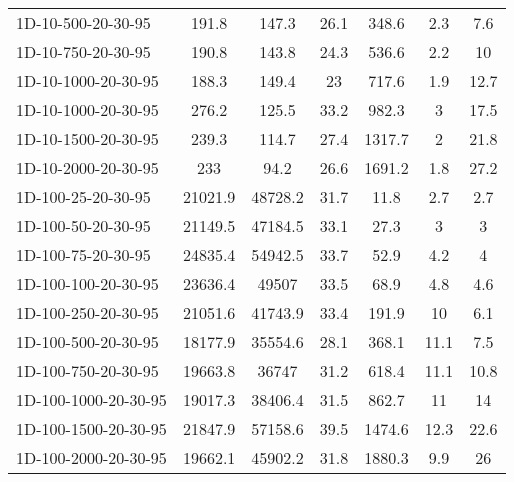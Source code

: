 \documentclass{article}
\begin{document}
\begin{table}[h]
\begin{center}
\begin{tabular}{|l||c|c|c|c|c|c|}
            1D-10-500-20-30-95                      & 191.8   & 147.3      & 26.1       & 348.6       & 2.3       & 7.6        \\
            1D-10-750-20-30-95                      & 190.8   & 143.8      & 24.3       & 536.6       & 2.2       & 10         \\
            1D-10-1000-20-30-95                     & 188.3   & 149.4      & 23         & 717.6       & 1.9       & 12.7       \\
            1D-10-1000-20-30-95                     & 276.2   & 125.5      & 33.2       & 982.3       & 3         & 17.5       \\
            1D-10-1500-20-30-95                     & 239.3   & 114.7      & 27.4       & 1317.7      & 2         & 21.8       \\
            1D-10-2000-20-30-95                     & 233     & 94.2       & 26.6       & 1691.2      & 1.8       & 27.2       \\
            \hline
            1D-100-25-20-30-95                       & 21021.9 & 48728.2    & 31.7       & 11.8        & 2.7       & 2.7        \\
            1D-100-50-20-30-95                       & 21149.5 & 47184.5    & 33.1       & 27.3        & 3         & 3          \\
            1D-100-75-20-30-95                       & 24835.4 & 54942.5    & 33.7       & 52.9        & 4.2       & 4          \\
            1D-100-100-20-30-95                      & 23636.4 & 49507      & 33.5       & 68.9        & 4.8       & 4.6        \\
            1D-100-250-20-30-95                      & 21051.6 & 41743.9    & 33.4       & 191.9       & 10        & 6.1        \\
            1D-100-500-20-30-95                      & 18177.9 & 35554.6    & 28.1       & 368.1       & 11.1      & 7.5        \\
            1D-100-750-20-30-95                      & 19663.8 & 36747      & 31.2       & 618.4       & 11.1      & 10.8       \\
            1D-100-1000-20-30-95                     & 19017.3 & 38406.4    & 31.5       & 862.7       & 11        & 14         \\
            1D-100-1500-20-30-95                     & 21847.9 & 57158.6    & 39.5       & 1474.6      & 12.3      & 22.6       \\
            1D-100-2000-20-30-95                     & 19662.1 & 45902.2    & 31.8       & 1880.3      & 9.9       & 26         \\

\end{tabular}
\end{center}
\end{table}
\end{document}
